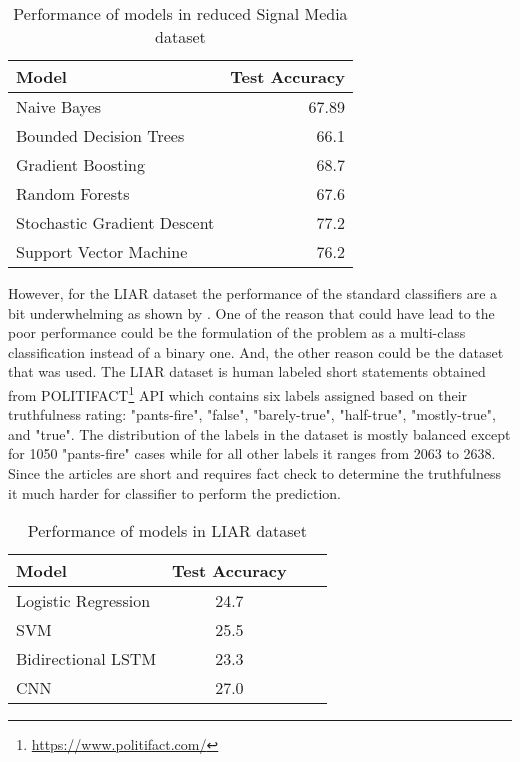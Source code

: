\begin{table}[h]
\begin{center}
\caption{Performance of models in reduced Signal Media dataset}
\label{tbl:signal_media_performance}
\begin{tabular}{lr}
\toprule 
Model&Test Accuracy\\
\midrule 
Naive Bayes&67.89\\
Bounded Decision Trees&66.1\\
Gradient Boosting&68.7\\
Random Forests&67.6\\
Stochastic Gradient Descent&77.2\\
Support Vector Machine&76.2\\
\bottomrule
\end{tabular}
\end{center}
\end{table}

However, for the LIAR dataset the performance of the standard classifiers are a bit underwhelming as shown by  \cite{wang2017liar}.  One of the reason that could have lead to the poor performance could be the formulation of the problem as a multi-class classification instead of a binary one. And, the other reason could be the dataset that was used. The LIAR dataset is human labeled short statements obtained from POLITIFACT\footnote{\url{https://www.politifact.com/}} API which contains six labels assigned based on their truthfulness rating: "pants-fire", "false", "barely-true", "half-true", "mostly-true", and "true". The distribution of the labels in the dataset is mostly balanced except for 1050 "pants-fire" cases while for all other labels it ranges from 2063 to 2638. Since the articles are short and requires fact check to determine the truthfulness it much harder for classifier to perform the prediction.

\begin{table}[h]
\begin{center}
\caption{Performance of models in LIAR dataset}
\label{tbl:liar_performance}
\begin{tabular}{lccc}
\toprule 
Model&Test Accuracy\\
\midrule 
Logistic Regression&24.7\\
SVM&25.5\\
Bidirectional LSTM&23.3\\
CNN&27.0\\
\bottomrule
\end{tabular}
\end{center}
\end{table}

